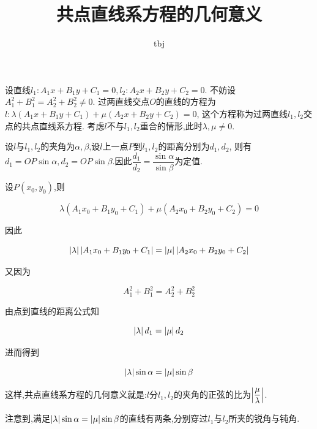 \documentclass{article}
\title{共点直线系方程的几何意义}
\author{tbj}
\date{}
\begin{document}
\maketitle

设直线$l_1: A_1x + B_1y + C_1 = 0, l_2: A_2x + B_2y + C_2 = 0$.
不妨设$A_1^2 + B_1^2 = A_2^2 + B_2^2 \neq 0$.
过两直线交点$O$的直线的方程为$l: \lambda (A_1x + B_1y + C_1) + \mu (A_2x + B_2y + C_2) = 0$,
这个方程称为过两直线$l_1, l_2$交点的共点直线系方程.
考虑$l$不与$l_1, l_2$重合的情形,此时$\lambda, \mu \neq 0$.

设$l$与$l_1, l_2$的夹角为$\alpha, \beta$,设$l$上一点$P$到$l_1, l_2$的距离分别为$d_1, d_2$,
则有$d_1 = OP \sin \alpha, d_2 = OP \sin \beta$.因此$\dfrac{d_1}{d_2} = \dfrac{\sin \alpha}{\sin \beta}$为定值.

设$P(x_0, y_0)$,则

\[ \lambda (A_1x_0 + B_1y_0 + C_1) + \mu (A_2x_0 + B_2y_0 + C_2) = 0 \]

因此

\[ \left\lvert \lambda \right\rvert \left\lvert A_1x_0 + B_1y_0 + C_1 \right\rvert =  \left\lvert \mu \right\rvert \left\lvert A_2x_0 + B_2y_0 + C_2 \right\rvert \]

又因为

\[A_1^2 + B_1^2 = A_2^2 + B_2^2\]

由点到直线的距离公式知

\[\left\lvert \lambda \right\rvert d_1 = \left\lvert \mu \right\rvert d_2\]

进而得到

\[\left\lvert \lambda \right\rvert \sin \alpha = \left\lvert \mu \right\rvert \sin \beta\]

这样,共点直线系方程的几何意义就是:$l$分$l_1, l_2$的夹角的正弦的比为$\left\lvert \dfrac{\mu}{\lambda} \right\rvert$.

\begin{rqq}
    注意到,满足$\left\lvert \lambda \right\rvert \sin \alpha = \left\lvert \mu \right\rvert \sin \beta$的直线有两条,分别穿过$l_1$与$l_2$所夹的锐角与钝角.
\end{rqq}
\end{document}

